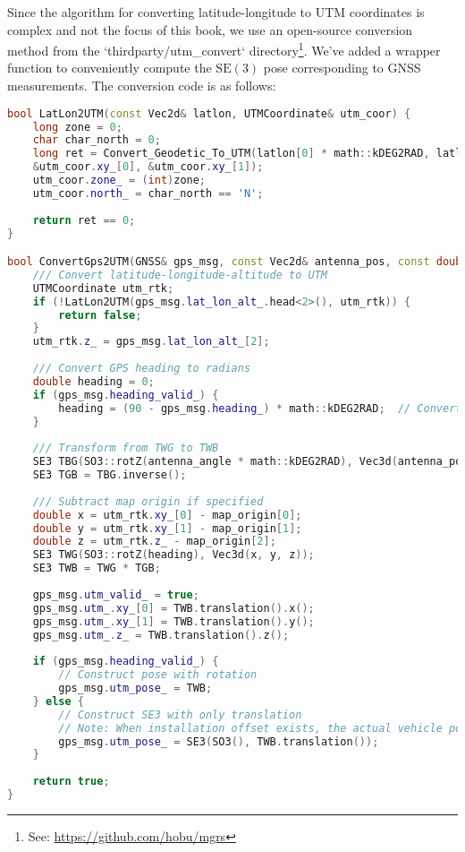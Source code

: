Since the algorithm for converting latitude-longitude to UTM coordinates is complex and not the focus of this book, we use an open-source conversion method from the `thirdparty/utm_convert` directory\footnote{See: \url{https://github.com/hobu/mgrs}}. We've added a wrapper function to conveniently compute the $\mathrm{SE}(3)$ pose corresponding to GNSS measurements. The conversion code is as follows:

\begin{lstlisting}[language=c++,caption=ch3/utm\_convert.cc]
bool LatLon2UTM(const Vec2d& latlon, UTMCoordinate& utm_coor) {
	long zone = 0;
	char char_north = 0;
	long ret = Convert_Geodetic_To_UTM(latlon[0] * math::kDEG2RAD, latlon[1] * math::kDEG2RAD, &zone, &char_north,
	&utm_coor.xy_[0], &utm_coor.xy_[1]);
	utm_coor.zone_ = (int)zone;
	utm_coor.north_ = char_north == 'N';
	
	return ret == 0;
}

bool ConvertGps2UTM(GNSS& gps_msg, const Vec2d& antenna_pos, const double& antenna_angle, const Vec3d& map_origin) {
	/// Convert latitude-longitude-altitude to UTM
	UTMCoordinate utm_rtk;
	if (!LatLon2UTM(gps_msg.lat_lon_alt_.head<2>(), utm_rtk)) {
		return false;
	}
	utm_rtk.z_ = gps_msg.lat_lon_alt_[2];
	
	/// Convert GPS heading to radians
	double heading = 0;
	if (gps_msg.heading_valid_) {
		heading = (90 - gps_msg.heading_) * math::kDEG2RAD;  // Convert from NED to ENU
	}
	
	/// Transform from TWG to TWB
	SE3 TBG(SO3::rotZ(antenna_angle * math::kDEG2RAD), Vec3d(antenna_pos[0], antenna_pos[1], 0));
	SE3 TGB = TBG.inverse();
	
	/// Subtract map origin if specified
	double x = utm_rtk.xy_[0] - map_origin[0];
	double y = utm_rtk.xy_[1] - map_origin[1];
	double z = utm_rtk.z_ - map_origin[2];
	SE3 TWG(SO3::rotZ(heading), Vec3d(x, y, z));
	SE3 TWB = TWG * TGB;
	
	gps_msg.utm_valid_ = true;
	gps_msg.utm_.xy_[0] = TWB.translation().x();
	gps_msg.utm_.xy_[1] = TWB.translation().y();
	gps_msg.utm_.z_ = TWB.translation().z();
	
	if (gps_msg.heading_valid_) {
		// Construct pose with rotation
		gps_msg.utm_pose_ = TWB;
	} else {
		// Construct SE3 with only translation
		// Note: When installation offset exists, the actual vehicle pose cannot be derived
		gps_msg.utm_pose_ = SE3(SO3(), TWB.translation());
	}
	
	return true;
}
\end{lstlisting}

